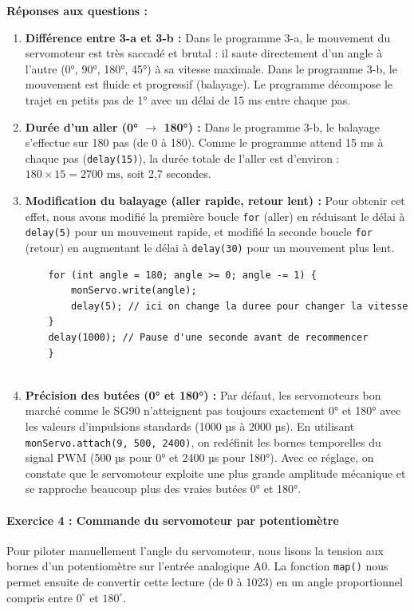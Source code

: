 \textbf{Réponses aux questions :}
\begin{enumerate}
	\item \textbf{Différence entre 3-a et 3-b :} Dans le programme 3-a, le mouvement du servomoteur est très saccadé et brutal : il saute directement d'un angle à l'autre (0°, 90°, 180°, 45°) à sa vitesse maximale. Dans le programme 3-b, le mouvement est fluide et progressif (balayage). Le programme décompose le trajet en petits pas de 1° avec un délai de 15 ms entre chaque pas.
	
	\item \textbf{Durée d'un aller (0° $\rightarrow$ 180°) :} Dans le programme 3-b, le balayage s'effectue sur 180 pas (de 0 à 180). Comme le programme attend 15 ms à chaque pas (\texttt{delay(15)}), la durée totale de l'aller est d'environ : $180 \times 15 = 2700\text{ ms}$, soit 2,7 secondes.
	
	\item \textbf{Modification du balayage (aller rapide, retour lent) :} Pour obtenir cet effet, nous avons modifié la première boucle \texttt{for} (aller) en réduisant le délai à \texttt{delay(5)} pour un mouvement rapide, et modifié la seconde boucle \texttt{for} (retour) en augmentant le délai à \texttt{delay(30)} pour un mouvement plus lent.
	
	\begin{lstlisting}
	for (int angle = 180; angle >= 0; angle -= 1) {
		monServo.write(angle);
		delay(5); // ici on change la duree pour changer la vitesse
	}
	delay(1000); // Pause d'une seconde avant de recommencer
	}
		
	\end{lstlisting}
	
	\item \textbf{Précision des butées (0° et 180°) :} Par défaut, les servomoteurs bon marché comme le SG90 n'atteignent pas toujours exactement 0° et 180° avec les valeurs d'impulsions standards (1000 µs à 2000 µs). En utilisant \texttt{monServo.attach(9, 500, 2400)}, on redéfinit les bornes temporelles du signal PWM (500 µs pour 0° et 2400 µs pour 180°). Avec ce réglage, on constate que le servomoteur exploite une plus grande amplitude mécanique et se rapproche beaucoup plus des vraies butées 0° et 180°.
\end{enumerate}

\paragraph{Exercice 4 : Commande du servomoteur par potentiomètre}
Pour piloter manuellement l'angle du servomoteur, nous lisons la tension aux bornes d'un potentiomètre sur l'entrée analogique A0.
La fonction \texttt{map()} nous permet ensuite de convertir cette lecture (de 0 à 1023) en un angle proportionnel compris entre $0^{\circ}$ et $180^{\circ}$.

